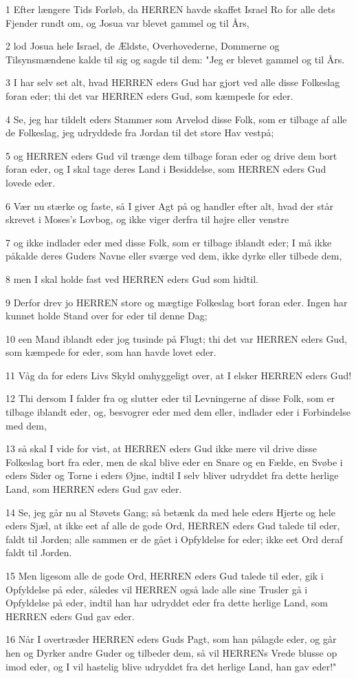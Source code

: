 \par 1 Efter længere Tids Forløb, da HERREN havde skaffet Israel Ro for alle dets Fjender rundt om, og Josua var blevet gammel og til Års,
\par 2 lod Josua hele Israel, de Ældste, Overhovederne, Dommerne og Tilsynsmændene kalde til sig og sagde til dem: "Jeg er blevet gammel og til Års.
\par 3 I har selv set alt, hvad HERREN eders Gud har gjort ved alle disse Folkeslag foran eder; thi det var HERREN eders Gud, som kæmpede for eder.
\par 4 Se, jeg har tildelt eders Stammer som Arvelod disse Folk, som er tilbage af alle de Folkeslag, jeg udryddede fra Jordan til det store Hav vestpå;
\par 5 og HERREN eders Gud vil trænge dem tilbage foran eder og drive dem bort foran eder, og I skal tage deres Land i Besiddelse, som HERREN eders Gud lovede eder.
\par 6 Vær nu stærke og faste, så I giver Agt på og handler efter alt, hvad der står skrevet i Moses's Lovbog, og ikke viger derfra til højre eller venstre
\par 7 og ikke indlader eder med disse Folk, som er tilbage iblandt eder; I må ikke påkalde deres Guders Navne eller sværge ved dem, ikke dyrke eller tilbede dem,
\par 8 men I skal holde fast ved HERREN eders Gud som hidtil.
\par 9 Derfor drev jo HERREN store og mægtige Folkeslag bort foran eder. Ingen har kunnet holde Stand over for eder til denne Dag;
\par 10 een Mand iblandt eder jog tusinde på Flugt; thi det var HERREN eders Gud, som kæmpede for eder, som han havde lovet eder.
\par 11 Våg da for eders Livs Skyld omhyggeligt over, at I elsker HERREN eders Gud!
\par 12 Thi dersom I falder fra og slutter eder til Levningerne af disse Folk, som er tilbage iblandt eder, og, besvogrer eder med dem eller, indlader eder i Forbindelse med dem,
\par 13 så skal I vide for vist, at HERREN eders Gud ikke mere vil drive disse Folkeslag bort fra eder, men de skal blive eder en Snare og en Fælde, en Svøbe i eders Sider og Torne i eders Øjne, indtil I selv bliver udryddet fra dette herlige Land, som HERREN eders Gud gav eder.
\par 14 Se, jeg går nu al Støvets Gang; så betænk da med hele eders Hjerte og hele eders Sjæl, at ikke eet af alle de gode Ord, HERREN eders Gud talede til eder, faldt til Jorden; alle sammen er de gået i Opfyldelse for eder; ikke eet Ord deraf faldt til Jorden.
\par 15 Men ligesom alle de gode Ord, HERREN eders Gud talede til eder, gik i Opfyldelse på eder, således vil HERREN også lade alle sine Trusler gå i Opfyldelse på eder, indtil han har udryddet eder fra dette herlige Land, som HERREN eders Gud gav eder.
\par 16 Når I overtræder HERREN eders Guds Pagt, som han pålagde eder, og går hen og Dyrker andre Guder og tilbeder dem, så vil HERRENs Vrede blusse op imod eder, og I vil hastelig blive udryddet fra det herlige Land, han gav eder!"

